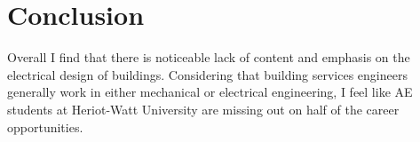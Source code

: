 
\section{Conclusion}

Overall I find that there is noticeable lack of content and emphasis on the electrical design of buildings.
Considering that building services engineers generally work in either mechanical or electrical engineering, I feel like AE students at Heriot-Watt University are missing out on half of the career opportunities.